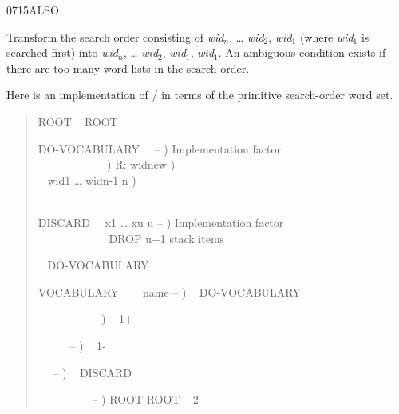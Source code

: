 \begin{newword}{0715}{ALSO}
	\stack{}{}

	Transform the search order consisting of \emph{wid}$_n$, {\ldots}
	\emph{wid}$_2$, \emph{wid}$_1$ (where \emph{wid}$_1$ is searched
	first) into \emph{wid}$_n$, {\ldots} \emph{wid}$_2$,
	\emph{wid}$_1$, \emph{wid}$_1$. An ambiguous condition exists if
	there are too many word lists in the search order.

	\begin{rationale} %
		Here is an implementation of / in terms
		of the primitive search-order word set.
		\begin{quote}\ttfamily
		  ROOT ~
		ROOT 

		\word{:} DO-VOCABULARY~~ -- )
			 Implementation factor \\
		\tab{}~~ 
				~~~~~~~~~\word{p} )  R: widnew ) \\
		\tab~  
				 wid1 {\ldots} widn-1 n ) \\
		\tab~   \\
		\word{;}

		\word{:} DISCARD~~ x1 {\ldots} xu u -- )
			 Implementation factor \\
		   
			~~~~~~~~~~~~ DROP u+1 stack items \\
		\word{;}

		  ~
		 \word{,} DO-VOCABULARY

		\word{:} VOCABULARY ~~~ name -- )
			  \word{,} ~ DO-VOCABULARY
		\word{;}

		\word{:}  ~~~~~~~~~ -- )
			 ~ 
			 1+ 
		\word{;}

		\word{:}  ~~~~~ -- )
			 ~ 
			 1- 
		\word{;}

		\word{:}  ~~ -- )
			 ~ 
			 DISCARD
		\word{;}

		\word{:}  ~~~~~~~~~ -- )
			ROOT ROOT ~ 2 
		\word{;}


\end{quote}
\end{rationale}
\end{newword}
